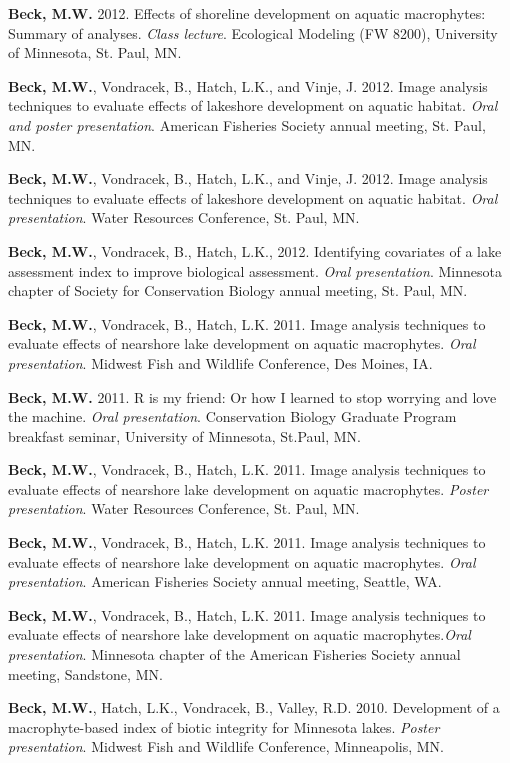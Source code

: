 \documentclass[letterpaper,12pt]{article}
\begin{document}
{\bf Beck, M.W.} 2012. Effects of shoreline development on aquatic macrophytes: Summary of analyses. \textit{Class lecture}. Ecological Modeling (FW 8200), University of Minnesota, St. Paul, MN.

{\bf Beck, M.W.}, Vondracek, B., Hatch, L.K., and Vinje, J. 2012. Image analysis techniques to evaluate effects of lakeshore development on aquatic habitat. \textit{Oral and poster presentation}. American Fisheries Society annual meeting, St. Paul, MN.

{\bf Beck, M.W.}, Vondracek, B., Hatch, L.K., and Vinje, J. 2012. Image analysis techniques to evaluate effects of lakeshore development on aquatic habitat. \textit{Oral presentation}. Water Resources Conference, St. Paul, MN.

{\bf Beck, M.W.}, Vondracek, B., Hatch, L.K., 2012. Identifying covariates of a lake assessment index to improve biological assessment. \textit{Oral presentation}. Minnesota chapter of Society for Conservation Biology annual meeting, St. Paul, MN.

{\bf Beck, M.W.}, Vondracek, B., Hatch, L.K. 2011. Image analysis techniques to evaluate effects of nearshore lake development on aquatic macrophytes. \textit{Oral presentation}. Midwest Fish and Wildlife Conference, Des Moines, IA.

{\bf Beck, M.W.} 2011. R is my friend: Or how I learned to stop worrying and love the machine. \textit{Oral presentation}. Conservation Biology Graduate Program breakfast seminar, University of Minnesota, St.Paul, MN.

{\bf Beck, M.W.}, Vondracek, B., Hatch, L.K. 2011. Image analysis techniques to evaluate effects of nearshore lake development on aquatic macrophytes. \textit{Poster presentation}. Water Resources Conference, St. Paul, MN.

{\bf Beck, M.W.}, Vondracek, B., Hatch, L.K. 2011. Image analysis techniques to evaluate effects of nearshore lake development on aquatic macrophytes. \textit{Oral presentation}. American Fisheries Society annual meeting, Seattle, WA.

{\bf Beck, M.W.}, Vondracek, B., Hatch, L.K. 2011. Image analysis techniques to evaluate effects of nearshore lake development on aquatic macrophytes.\textit{Oral presentation}. Minnesota chapter of the American Fisheries Society annual meeting, Sandstone, MN.

{\bf Beck, M.W.}, Hatch, L.K., Vondracek, B., Valley, R.D. 2010. Development of a macrophyte-based index of biotic integrity for Minnesota lakes. \textit{Poster presentation}. Midwest Fish and Wildlife Conference, Minneapolis, MN.
\end{document}

